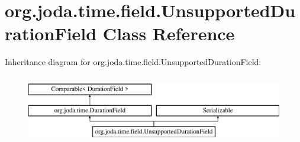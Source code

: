 \hypertarget{classorg_1_1joda_1_1time_1_1field_1_1_unsupported_duration_field}{\section{org.\-joda.\-time.\-field.\-Unsupported\-Duration\-Field Class Reference}
\label{classorg_1_1joda_1_1time_1_1field_1_1_unsupported_duration_field}
}
Inheritance diagram for org.\-joda.\-time.\-field.\-Unsupported\-Duration\-Field\-:\begin{figure}[H]
\begin{center}
\leavevmode
\includegraphics[height=3.000000cm]{classorg_1_1joda_1_1time_1_1field_1_1_unsupported_duration_field}
\end{center}
\end{figure}
